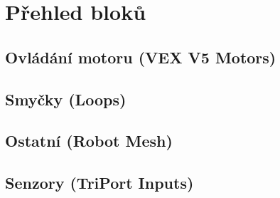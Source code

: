\errata

\cleardoublepage

\setcounter{secnumdepth}{3}

\cleardoublepage


\cleardoublepage


\cleardoublepage


\cleardoublepage


\cleardoublepage


\cleardoublepage

\setcounter{secnumdepth}{0}

\newcommand{\where}[1]{{\normalfont (#1)}}

\section{Přehled bloků}

\subsection*{Ovládání motoru \where{VEX V5 Motors}}
\begin{itemize}
	\blockMotorStart
	\blockMotorStop
	\blockMotorDistance
	\blockMotorVelocity
\end{itemize}

\subsection*{Smyčky \where{Loops}}
\begin{itemize}
	\blockLoop
	\blockLoopForever
	\blockLoopWhile
\end{itemize}

\subsection*{Ostatní \where{Robot Mesh}}
\begin{itemize}
	\blockStart
	\blockMotorDone
	\blockWait
	\blockWaitUntil
	\blockComment
\end{itemize}

\subsection*{Senzory \where{TriPort Inputs}}
\begin{itemize}
	\blockBumperPressed
\end{itemize}


